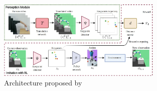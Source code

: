 \begin{figure}[htb]
    \centering
    \includegraphics[width=0.7\textwidth]{Figures/images/learning_by_watching/learning_by_watching.jpg}
    \caption{Architecture proposed by \cite{xiong2021learning_by_watching}}
    \label{fig:lbw}
\end{figure}
